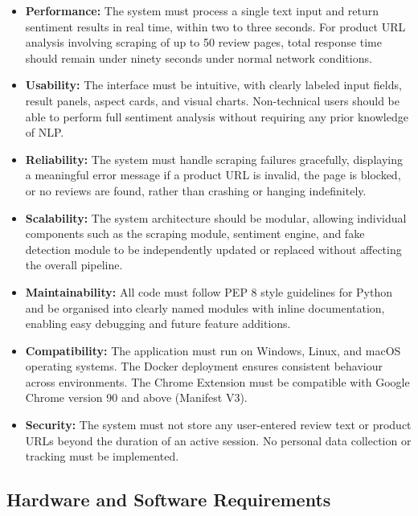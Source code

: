 \documentclass[12pt,a4paper]{report}
\begin{document}
\begin{itemize}
  \item \textbf{Performance:} The system must process a single text input and return sentiment results in real time, within two to three seconds. For product URL analysis involving scraping of up to 50 review pages, total response time should remain under ninety seconds under normal network conditions.

  \item \textbf{Usability:} The interface must be intuitive, with clearly labeled input fields, result panels, aspect cards, and visual charts. Non-technical users should be able to perform full sentiment analysis without requiring any prior knowledge of NLP.

  \item \textbf{Reliability:} The system must handle scraping failures gracefully, displaying a meaningful error message if a product URL is invalid, the page is blocked, or no reviews are found, rather than crashing or hanging indefinitely.

  \item \textbf{Scalability:} The system architecture should be modular, allowing individual components such as the scraping module, sentiment engine, and fake detection module to be independently updated or replaced without affecting the overall pipeline.

  \item \textbf{Maintainability:} All code must follow PEP 8 style guidelines for Python and be organised into clearly named modules with inline documentation, enabling easy debugging and future feature additions.

  \item \textbf{Compatibility:} The application must run on Windows, Linux, and macOS operating systems. The Docker deployment ensures consistent behaviour across environments. The Chrome Extension must be compatible with Google Chrome version 90 and above (Manifest V3).

  \item \textbf{Security:} The system must not store any user-entered review text or product URLs beyond the duration of an active session. No personal data collection or tracking must be implemented.
\end{itemize}

\subsection{Hardware and Software Requirements}
\end{document}
